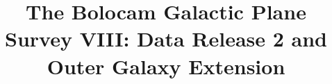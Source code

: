 
\standalonefalse
\renewcommand{\okinfinal}[1]{{#1}}

\title{The Bolocam Galactic Plane Survey VIII: Data Release 2 and Outer Galaxy Extension}










% 


% 
% 









